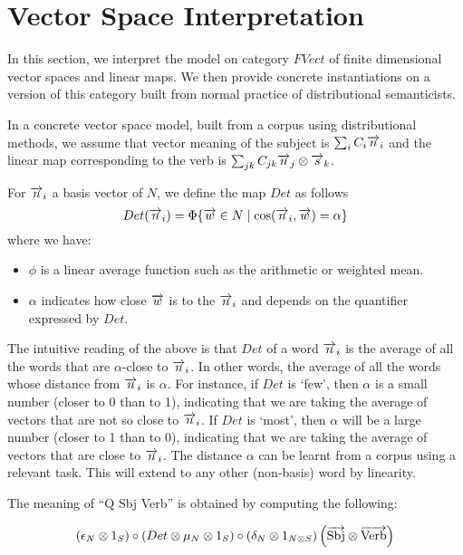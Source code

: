 \section{Vector Space Interpretation}


In this section, we interpret the model on category $FVect$ of finite dimensional vector spaces and linear maps. We then provide concrete instantiations on a version of this category built from normal practice of distributional semanticists. 

In a concrete vector space model, built from a corpus using distributional methods, we assume that  vector meaning of the subject is $\sum_i C_i \overrightarrow{n}_i$ and the linear map corresponding to the verb is $\sum_{jk} C_{jk} \overrightarrow{n}_j \otimes \overrightarrow{s}_k$. 

For $\overrightarrow{n}_i$ a basis vector of $N$, we define  the map $Det$  as follows 
\[
Det(\overrightarrow{n}_i) = \Phi \{\overrightarrow{w} \in N \mid \cos(\overrightarrow{n}_i, \overrightarrow{w}) = \alpha\}
\]
where we have:
\begin{itemize}
\item  $\phi$ is a linear average function such as the   arithmetic or weighted mean. 
\item  $\alpha$ indicates how close $\overrightarrow{w}$ is to the $\overrightarrow{n}_i$ and depends on the quantifier expressed by $Det$. 
\end{itemize}

\noindent
The intuitive reading of the above is that $Det$ of a word $\overrightarrow{n}_i$ is the average of all the words that are $\alpha$-close to $\overrightarrow{n}_i$. In other words, the average of all the words  whose distance from $\overrightarrow{n}_i$ is $\alpha$.  For instance, if $Det$ is `few', then $\alpha$ is a small number (closer to 0 than to 1), indicating that we are taking the average of vectors that are not so close to $\overrightarrow{n}_i$. If $Det$ is `most', then $\alpha$ will be a large number (closer to 1 than to 0), indicating that we are taking the average of vectors that are close to $\overrightarrow{n}_i$. The distance $\alpha$ can be learnt from a corpus using a relevant task. This will extend to any other (non-basis) word by linearity. 

The meaning of ``Q Sbj Verb'' is obtained by computing the following:

\[
(\epsilon_N \otimes 1_S) \circ (Det \otimes  \mu_N \otimes 1_S) \circ (\delta_N \otimes 1_{N \otimes S})\left(\overrightarrow{\text{Sbj}} \otimes \overrightarrow{\text{Verb}}\right)
\]

